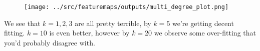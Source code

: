 %
%
\begin{answer}
\begin{figure}[H]
\texttt{[image: ../src/featuremaps/outputs/multi\_degree\_plot.png]}
\end{figure}

We see that $k=1,2,3$ are all pretty terrible, by $k=5$ we're getting decent fitting. $k=10$ is even better, however by $k=20$ we observe some over-fitting that you'd probably disagree with.
\end{answer}
%